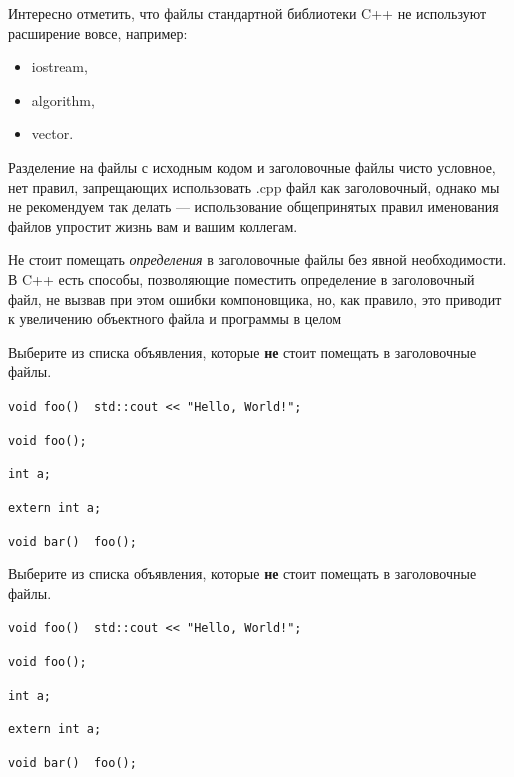 \documentclass[9pt]{beamer}
\begin{document}
\begin{frame}
    Интересно отметить, что файлы стандартной библиотеки C++ не используют расширение вовсе, например:
    \begin{itemize}
        \item iostream,
        \item algorithm,
        \item vector.
    \end{itemize}
    Разделение на файлы с исходным кодом и заголовочные файлы чисто условное, нет правил, запрещающих использовать .cpp файл как заголовочный, однако мы не рекомендуем так делать — использование общепринятых правил именования файлов упростит жизнь вам и вашим коллегам.
    
    Не стоит помещать \emph{определения} в заголовочные файлы без явной необходимости. В C++ есть способы, позволяющие поместить определение в заголовочный файл, не вызвав при этом ошибки компоновщика, но, как правило, это приводит к увеличению объектного файла и программы в целом
\end{frame}

\begin{frame}
    Выберите из списка объявления, которые \textbf{не} ﻿стоит помещать в заголовочные файлы.
    \begin{description}[align=left]
        \item[\Square] \texttt{void foo() { std::cout << "Hello, World!\n"; }}
        \item[\Square] \texttt{void foo();}
        \item[\Square] \texttt{int a;}
        \item[\Square] \texttt{extern int a;}
        \item[\Square] \texttt{void bar() { foo(); }}
    \end{description}
\end{frame}

\begin{frame}
    Выберите из списка объявления, которые \textbf{не} ﻿стоит помещать в заголовочные файлы.
    \begin{description}[align=left]
        \item[\XBox] \texttt{void foo() { std::cout << "Hello, World!\n"; }}
        \item[\Square] \texttt{void foo();}
        \item[\XBox] \texttt{int a;}
        \item[\Square] \texttt{extern int a;}
        \item[\XBox] \texttt{void bar() { foo(); }}
    \end{description}
\end{frame}
\end{document}
